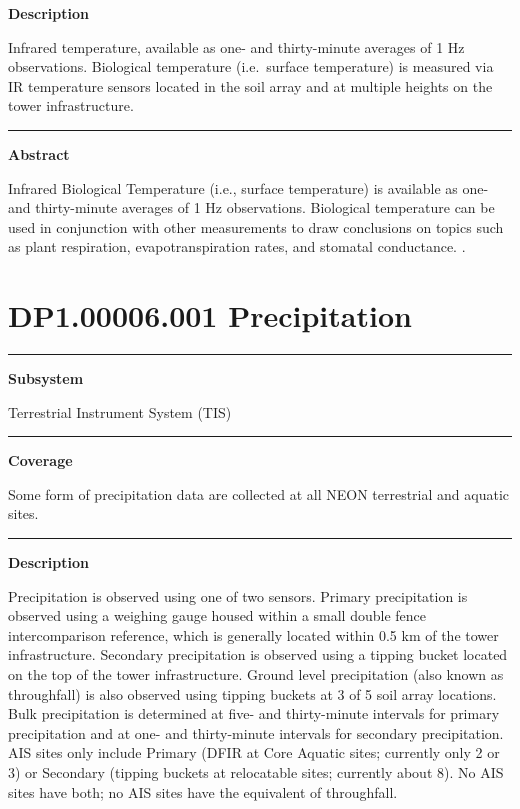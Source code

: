 \documentclass[]{article}
\begin{document}
\textbf{Description}

Infrared temperature, available as one- and thirty-minute averages of 1
Hz observations. Biological temperature (i.e.~surface temperature) is
measured via IR temperature sensors located in the soil array and at
multiple heights on the tower infrastructure.

\begin{center}\rule{0.5\linewidth}{\linethickness}\end{center}

\textbf{Abstract}

Infrared Biological Temperature (i.e., surface temperature) is available
as one- and thirty-minute averages of 1 Hz observations. Biological
temperature can be used in conjunction with other measurements to draw
conclusions on topics such as plant respiration, evapotranspiration
rates, and stomatal conductance. \newpage
.

\section{DP1.00006.001 Precipitation}\label{dp1.00006.001-precipitation}

\begin{center}\rule{0.5\linewidth}{\linethickness}\end{center}

\textbf{Subsystem}

Terrestrial Instrument System (TIS)

\begin{center}\rule{0.5\linewidth}{\linethickness}\end{center}

\textbf{Coverage}

Some form of precipitation data are collected at all NEON terrestrial
and aquatic sites.

\begin{center}\rule{0.5\linewidth}{\linethickness}\end{center}

\textbf{Description}

Precipitation is observed using one of two sensors. Primary
precipitation is observed using a weighing gauge housed within a small
double fence intercomparison reference, which is generally located
within 0.5 km of the tower infrastructure. Secondary precipitation is
observed using a tipping bucket located on the top of the tower
infrastructure. Ground level precipitation (also known as throughfall)
is also observed using tipping buckets at 3 of 5 soil array locations.
Bulk precipitation is determined at five- and thirty-minute intervals
for primary precipitation and at one- and thirty-minute intervals for
secondary precipitation. AIS sites only include Primary (DFIR at Core
Aquatic sites; currently only 2 or 3) or Secondary (tipping buckets at
relocatable sites; currently about 8). No AIS sites have both; no AIS
sites have the equivalent of throughfall.
\end{document}
